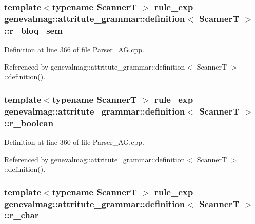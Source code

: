 \hypertarget{structgenevalmag_1_1attritute__grammar_1_1definition_a7220d53736e4c11511bc1472c04ad803}{
\subsubsection[{r\_\-bloq\_\-sem}]{\setlength{\rightskip}{0pt plus 5cm}template$<$typename ScannerT $>$ {\bf rule\_\-exp} {\bf genevalmag::attritute\_\-grammar::definition}$<$ ScannerT $>$::{\bf r\_\-bloq\_\-sem}}}
\label{structgenevalmag_1_1attritute__grammar_1_1definition_a7220d53736e4c11511bc1472c04ad803}


Definition at line 366 of file Parser\_\-AG.cpp.



Referenced by genevalmag::attritute\_\-grammar::definition$<$ ScannerT $>$::definition().

\hypertarget{structgenevalmag_1_1attritute__grammar_1_1definition_ab2df618e7839598d3cd9de20bc825ff0}{
\subsubsection[{r\_\-boolean}]{\setlength{\rightskip}{0pt plus 5cm}template$<$typename ScannerT $>$ {\bf rule\_\-exp} {\bf genevalmag::attritute\_\-grammar::definition}$<$ ScannerT $>$::{\bf r\_\-boolean}}}
\label{structgenevalmag_1_1attritute__grammar_1_1definition_ab2df618e7839598d3cd9de20bc825ff0}


Definition at line 360 of file Parser\_\-AG.cpp.



Referenced by genevalmag::attritute\_\-grammar::definition$<$ ScannerT $>$::definition().

\hypertarget{structgenevalmag_1_1attritute__grammar_1_1definition_a8ba1a8b7f2d8442370525bef29181fb6}{
\subsubsection[{r\_\-char}]{\setlength{\rightskip}{0pt plus 5cm}template$<$typename ScannerT $>$ {\bf rule\_\-exp} {\bf genevalmag::attritute\_\-grammar::definition}$<$ ScannerT $>$::{\bf r\_\-char}}}
\label{structgenevalmag_1_1attritute__grammar_1_1definition_a8ba1a8b7f2d8442370525bef29181fb6}


